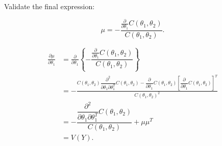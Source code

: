 \documentclass[UTF8,a4paper,10pt]{article}
\begin{document}

Validate the final expression:

\[  \mu=-\dfrac{\frac{\partial}{\partial \theta_1} C\left(\theta_1, \theta_2\right)}{C\left(\theta_1, \theta_2\right)}.\]


\begin{equation*}
  \begin{aligned}
    \frac{\partial \mu}{\partial \theta_1} 
    & = \frac{\partial}{\partial \theta_1}\left\{-\dfrac{\frac{\partial}{\partial \theta_1} C\left(\theta_1, \theta_2\right)}{C\left(\theta_1, \theta_2\right)}\right\}\\
    & =-\frac{C\left(\theta_1, \theta_2\right)\dfrac{\partial^2}{\partial \theta_1 \partial \theta_1^T} C\left(\theta_1, \theta_2\right)-\dfrac{\partial}{\partial \theta_1} C\left(\theta_1, \theta_2\right)\left[\dfrac{\partial}{\partial \theta_1} C\left(\theta_1, \theta_2\right)\right]^T}{C\left(\theta_1, \theta_2\right)^2}\\
    &= -\dfrac{\dfrac{\partial^2}{\partial \theta_1 \partial \theta_1^T} C\left(\theta_1, \theta_2\right)}{C\left(\theta_1, \theta_2\right)}+\mu \mu^T\\
    &= V(Y).
  \end{aligned}
\end{equation*}


\begin{equation*}
  \begin{aligned}
  \end{aligned}
\end{equation*}
\end{document}
